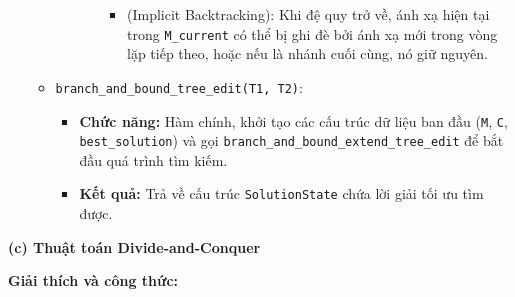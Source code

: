 \documentclass{article}
\begin{document}
\begin{itemize}
\begin{itemize}
\begin{itemize}
\begin{itemize}
\begin{itemize}
                                \item (Implicit Backtracking): Khi đệ quy trở về, ánh xạ hiện tại trong \texttt{M\_current} có thể bị ghi đè bởi ánh xạ mới trong vòng lặp tiếp theo, hoặc nếu là nhánh cuối cùng, nó giữ nguyên.
                            \end{itemize}
                    \end{itemize}
            \end{itemize}
        \item \texttt{branch\_and\_bound\_tree\_edit(T1, T2)}:
            \begin{itemize}
                \item \textbf{Chức năng:} Hàm chính, khởi tạo các cấu trúc dữ liệu ban đầu (\texttt{M}, \texttt{C}, \texttt{best\_solution}) và gọi \texttt{branch\_and\_bound\_extend\_tree\_edit} để bắt đầu quá trình tìm kiếm.
                \item \textbf{Kết quả:} Trả về cấu trúc \texttt{SolutionState} chứa lời giải tối ưu tìm được.
            \end{itemize}
    \end{itemize}
\end{itemize}


\textbf{(c) Thuật toán Divide-and-Conquer}

\textbf{Giải thích và công thức:}
\end{document}

